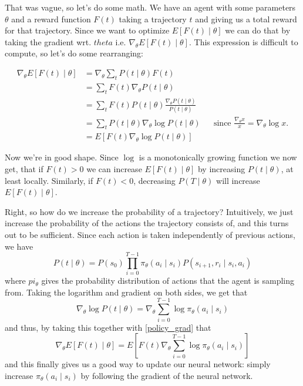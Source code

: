 \documentclass{article}
\theoremstyle{changedot}
\theoremstyle{changedotbreak}
\theoremstyle{nonumberplain}
\begin{document}
That was vague, so let's do some math. We have an agent with some parameters $\theta$ and a reward function $F(t)$ taking a trajectory $t$ and giving us a total reward for that trajectory. Since we want to optimize $E[F(t) \mid \theta]$ we can do that by taking the gradient wrt. $theta$ i.e. $\nabla_{\theta} E[F(t) \mid \theta]$. This expression is difficult to compute, so let's do some rearranging:

\begin{equation} \label{policy_grad}
\begin{aligned}
  \nabla_{\theta} E[F(t) \mid \theta] &= \nabla_{\theta} \sum_{t}P(t \mid \theta) F(t) \\
                                      &= \sum_{t} F(t) \nabla_{\theta} P(t \mid \theta)  \\
                                      &= \sum_{t} F(t) P(t \mid \theta) \frac{\nabla_{\theta} P(t \mid \theta)}{P(t \mid \theta)} \\
                                      &= \sum_{t} P(t \mid \theta) \nabla_{\theta} \log P(t \mid \theta) && \text{since $\frac{\nabla_{\theta} x}{x} = \nabla_{\theta} \log x$.} \\
                                      &= E[F(t) \nabla_{\theta} \log P(t \mid \theta)]
\end{aligned}
\end{equation}

Now we're in good shape. Since $\log$ is a monotonically growing function we now get, that if $F(t) > 0$ we can increase $E[F(t) \mid \theta]$ by increasing $P(t \mid \theta)$, at least locally. Similarly, if $F(t) < 0$, decreasing $P(T \mid \theta)$ will increase $E[F(t) \mid \theta]$.

Right, so how do we increase the probability of a trajectory? Intuitively, we just increase the probability of the actions the trajectory consists of, and this turns out to be sufficient. Since each action is taken independently of previous actions, we have \[P(t \mid \theta) = P(s_{0}) \prod_{i=0}^{T-1} \pi_{\theta}(a_{i} \mid s_{i}) P(s_{i+1}, r_{i} \mid s_{i}, a_{i})\] where $pi_{\theta}$ gives the probability distribution of actions that the agent is sampling from. Taking the logarithm and gradient on both sides, we get that \[\nabla_{\theta} \log P(t \mid \theta) = \nabla_{\theta} \sum_{i=0}^{T-1} \log \pi_{\theta}(a_{i} \mid s_{i})\] and thus, by taking this together with \ref{policy_grad} that \[\nabla_{\theta} E[F(t) \mid \theta] = E\left[ F(t) \nabla_{\theta} \sum_{i=0}^{T-1} \log \pi_{\theta} (a_{i} \mid s_{i}) \right]\] and this finally gives us a good way to update our neural network: simply increase $\pi_{\theta} (a_{i} \mid s_{i})$ by following the gradient of the neural network.
\end{document}
